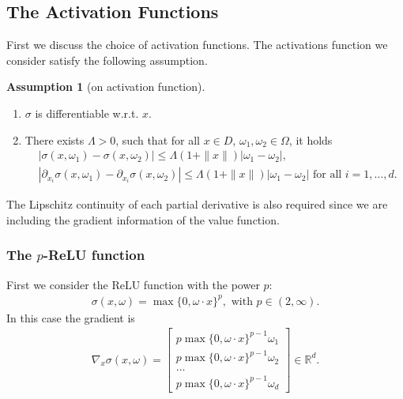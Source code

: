 \documentclass[12pt,fleqn]{amsart}
\theoremstyle{definition}
\newtheorem{assumption}{Assumption}[section]
\begin{document}
\subsection{The Activation Functions}
First we discuss the choice of activation functions. 
The activations function we consider satisfy the following assumption.
\begin{assumption}[on activation function]
\label{assumption on actfun}
\quad
\begin{enumerate}
\item  $\sigma$ is differentiable w.r.t. $x$. 
\item There exists $ \Lambda > 0$, such that for all $x \in D$, $\omega_1, \omega_2 \in \Omega$, it holds 
\begin{align*}
	&|\sigma(x, \omega_1) - \sigma(x, \omega_2) | \le \Lambda (1 + \|x\|) |\omega_1 - \omega_2|,\\
	& |\partial_{x_i} \sigma(x, \omega_1) - \partial_{x_i} \sigma(x, \omega_2) | \le \Lambda (1 + \|x\|) |\omega_1 - \omega_2| \text{ for all $i = 1, \dots, d$. } 
\end{align*}
\end{enumerate}
\end{assumption}

The Lipschitz continuity of each partial derivative is also required since we are including the gradient information of the value function.



\subsubsection*{The $p$-ReLU function}
\quad\par
First we consider the ReLU function with the power $p$:
\begin{align*}
	\sigma(x, \omega) = \max\{0, \omega \cdot x\}^{p}, \text{ with } p \in (2, \infty). 
\end{align*}
In this case the gradient is 
\begin{align*}
	\nabla_x \sigma(x, \omega) = 
	\begin{bmatrix}
		p \max\{0, \omega \cdot x \}^{p - 1} \omega_1\\
		p \max\{0, \omega \cdot x \}^{p - 1} \omega_2 \\
		\dots \\
		p \max\{0, \omega \cdot x \}^{p - 1} \omega_d
	\end{bmatrix} \in \mathbb{R}^d. 
\end{align*}
\end{document}
